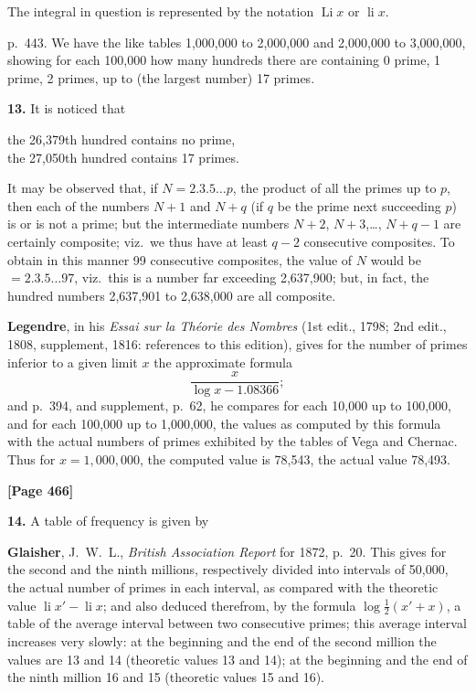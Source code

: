 \documentclass[11pt,a4paper]{book}
\begin{document}
The integral in question is represented by the notation $\operatorname{Li}x$ or $\operatorname{li}x$.

p.\ 443. We have the like tables 1,000,000 to 2,000,000 and 2,000,000 to 3,000,000, showing for each 100,000 how many hundreds there are containing 0 prime, 1 prime, 2 primes, up to (the largest number) 17 primes.

\textbf{13.} It is noticed that
\begin{center}
the 26,379th hundred contains no prime,\\
the 27,050th hundred contains 17 primes.
\end{center}

It may be observed that, if $N = 2.3.5\ldots p$, the product of all the primes up to $p$, then each of the numbers $N+1$ and $N+q$ (if $q$ be the prime next succeeding $p$) is or is not a prime; but the intermediate numbers $N+2$, $N+3$,\ldots, $N+q-1$ are certainly composite; viz.\ we thus have at least $q-2$ consecutive composites. To obtain in this manner 99 consecutive composites, the value of $N$ would be $= 2.3.5\ldots 97$, viz.\ this is a number far exceeding 2,637,900; but, in fact, the hundred numbers 2,637,901 to 2,638,000 are all composite.

\textbf{Legendre}, in his \textit{Essai sur la Th\'{e}orie des Nombres} (1st edit., 1798; 2nd edit., 1808, supplement, 1816: references to this edition), gives for the number of primes inferior to a given limit $x$ the approximate formula
\[\frac{x}{\log x - 1.08366};\]
and p.\ 394, and supplement, p.\ 62, he compares for each 10,000 up to 100,000, and for each 100,000 up to 1,000,000, the values as computed by this formula with the actual numbers of primes exhibited by the tables of Vega and Chernac. Thus for $x = 1{,}000{,}000$, the computed value is 78,543, the actual value 78,493.


\newpage
\textbf{[Page 466]}

\textbf{14.} A table of frequency is given by

\quad\textbf{Glaisher}, J.\ W.\ L., \textit{British Association Report} for 1872, p.\ 20. This gives for the second and the ninth millions, respectively divided into intervals of 50,000, the actual number of primes in each interval, as compared with the theoretic value $\operatorname{li}x' - \operatorname{li}x$; and also deduced therefrom, by the formula $\log\frac{1}{2}(x'+x)$, a table of the average interval between two consecutive primes; this average interval increases very slowly: at the beginning and the end of the second million the values are 13 and 14 (theoretic values 13 and 14); at the beginning and the end of the ninth million 16 and 15 (theoretic values 15 and 16).
\end{document}
